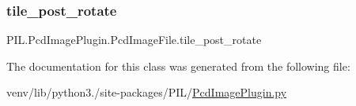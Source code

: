 \subsubsection{\texorpdfstring{tile\+\_\+post\+\_\+rotate}{tile\_post\_rotate}}
{\footnotesize\ttfamily P\+I\+L.\+Pcd\+Image\+Plugin.\+Pcd\+Image\+File.\+tile\+\_\+post\+\_\+rotate}



The documentation for this class was generated from the following file\+:\begin{DoxyCompactItemize}
\item 
venv/lib/python3./site-\/packages/\+P\+I\+L/\hyperlink{PcdImagePlugin_8py}{Pcd\+Image\+Plugin.\+py}\end{DoxyCompactItemize}
